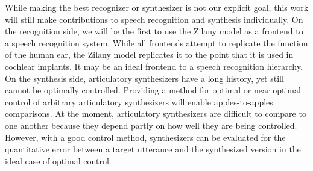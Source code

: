 \documentclass{article}
\begin{document}
While making the best recognizer or synthesizer
is not our explicit goal,
this work will still make contributions
to speech recognition and synthesis individually.
On the recognition side,
we will be the first to use
the Zilany model as a frontend
to a speech recognition system.
While all frontends attempt to
replicate the function of the human ear,
the Zilany model replicates it
to the point that it is used
in cochlear implants.
It may be an ideal frontend
to a speech recognition hierarchy.
On the synthesis side,
articulatory synthesizers
have a long history,
yet still cannot be optimally controlled.
Providing a method for
optimal or near optimal control
of arbitrary articulatory synthesizers
will enable apples-to-apples comparisons.
At the moment, articulatory synthesizers
are difficult to compare to one another
because they depend partly
on how well they are being controlled.
However, with a good control method,
synthesizers can be evaluated
for the quantitative error between
a target utterance
and the synthesized version
in the ideal case of optimal control.



\end{document}
